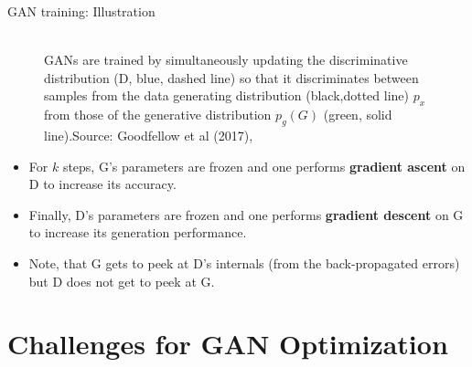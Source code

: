 \begin{frame} {GAN training: Illustration}
\begin{figure}
\centering
{}
\tiny{\\GANs are trained by simultaneously updating the discriminative distribution
(D, blue, dashed line) so that it discriminates between samples from the data generating distribution (black,dotted line) $p_x$ from those of the generative distribution $p_g (G)$ (green, solid line).Source: Goodfellow et al (2017),}
\end{figure}
\begin{itemize}
\item For $k$ steps, G's parameters are frozen and one performs \textbf{gradient ascent} on D to increase its accuracy.
\item Finally, D's parameters are frozen and one performs \textbf{gradient descent} on G to increase its generation performance. %
\item Note, that G gets to peek at D's internals (from the back-propagated errors) but D  does not get to peek at G.
\end{itemize}
\end{frame}



%
\section{Challenges for GAN Optimization}



